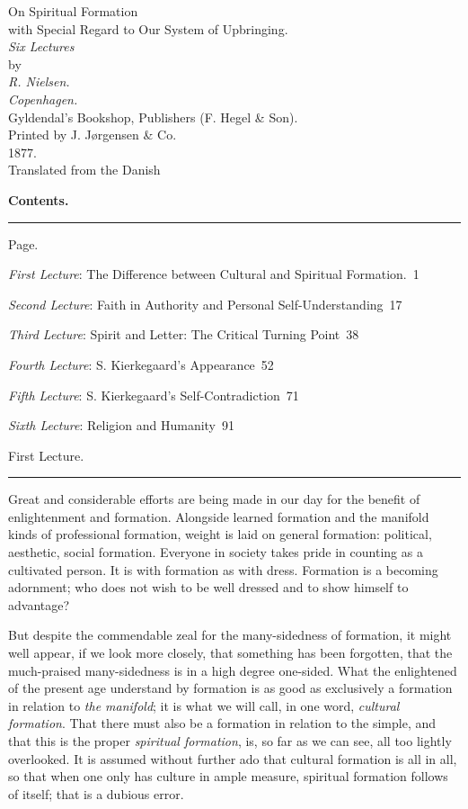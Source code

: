 \documentclass[12pt,a4paper,openany]{book}
\newcommand{\tocline}[3]{\noindent\makebox[2.2em][r]{#1}\hspace{0.6em}#2\dotfill\ #3\par}
\newcommand{\opage}[1]{\marginnote{\footnotesize\textit{[#1]}}}
\newcommand{\lecture}[1]{\clearpage\begin{center}{\large #1}\\[0.4em]\rule{3em}{0.4pt}\end{center}\medskip\noindent}
\begin{document}
\begin{titlepage}
\begin{center}
\vspace*{3em}
{\Huge On Spiritual Formation}\\[1em]
{\large with Special Regard to Our System of Upbringing.}\\[2.5em]
\emph{Six Lectures}\\[1em]
by\\[1em]
{\large \emph{R. Nielsen.}}\\[5em]
\emph{Copenhagen.}\\[0.5em]
Gyldendal's Bookshop, Publishers (F. Hegel \& Son).\\[0.5em]
{\small Printed by J. Jørgensen \& Co.}\\[0.5em]
{\small 1877.}\\[4em]
{\small Translated from the Danish}
\end{center}
\end{titlepage}
\begin{center}{\large\textbf{Contents.}}\\[0.3em]\rule{3em}{0.4pt}\end{center}
\hfill{\small Page.}\par
{\small
\tocline{}{\emph{First Lecture}: The Difference between Cultural and Spiritual Formation.}{1}
\tocline{}{\emph{Second Lecture}: Faith in Authority and Personal Self-Understanding}{17}
\tocline{}{\emph{Third Lecture}: Spirit and Letter: The Critical Turning Point}{38}%
\tocline{}{\emph{Fourth Lecture}: S. Kierkegaard's Appearance}{52}
\tocline{}{\emph{Fifth Lecture}: S. Kierkegaard's Self-Contradiction}{71}
\tocline{}{\emph{Sixth Lecture}: Religion and Humanity}{91}
}

\lecture{First Lecture.}
\opage{1}Great and considerable efforts are being made in our day for the benefit
of enlightenment and formation. Alongside learned formation and the
manifold kinds of professional formation, weight is laid on general
formation: political, aesthetic, social formation. Everyone in society
takes pride in counting as a cultivated person. It is with formation as
with dress. Formation is a becoming adornment; who does not wish to be
well dressed and to show himself to advantage?

But despite the commendable zeal for the many-sidedness of formation, it
might well appear, if we look more closely, that something has been
forgotten, that the much-praised many-sidedness is in a high degree
one-sided. What the enlightened of the present age understand by
formation is as good as exclusively a formation in relation to
\emph{the manifold}; it is what we will call, in one word, \emph{cultural
formation}. That there must also be a formation in relation to the
simple, and that this is the proper \emph{spiritual formation}, is, so
far as we can see, all too lightly overlooked. It is assumed without
further ado that cultural formation is all in all, so that when one only
has culture in ample measure, spiritual formation follows of itself; that
is a dubious error.
\end{document}
